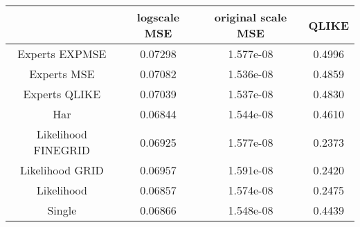
\begin{tabular}{c|c|c|c}
    & logscale MSE & original scale MSE & QLIKE \\\hline
Experts EXPMSE & 0.07298 & 1.577e-08 & 0.4996 \\
Experts MSE & 0.07082 & 1.536e-08 & 0.4859 \\
Experts QLIKE & 0.07039 & 1.537e-08 & 0.4830 \\
Har & 0.06844 & 1.544e-08 & 0.4610 \\
Likelihood FINEGRID & 0.06925 & 1.577e-08 & 0.2373 \\
Likelihood GRID & 0.06957 & 1.591e-08 & 0.2420 \\
Likelihood & 0.06857 & 1.574e-08 & 0.2475 \\
Single & 0.06866 & 1.548e-08 & 0.4439
\end{tabular}